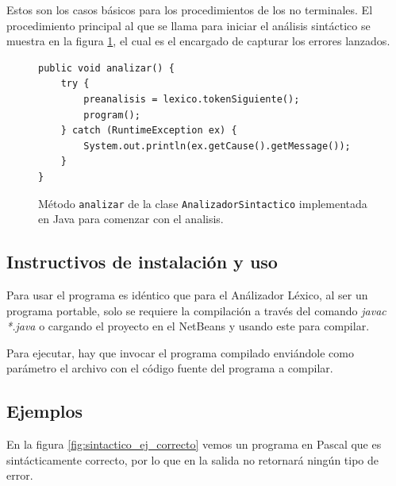 Estos son los casos básicos para los procedimientos de los no terminales. El procedimiento principal al que se llama para iniciar el análisis sintáctico se muestra en la figura \ref{fig:metodo_analizar}, el cual es el encargado de capturar los errores lanzados.

\begin{figure}[H]
\begin{verbatim}
public void analizar() {
	try {
		preanalisis = lexico.tokenSiguiente();
		program();
	} catch (RuntimeException ex) {
		System.out.println(ex.getCause().getMessage());
	}
}
\end{verbatim}
\caption{Método \texttt{analizar} de la clase \texttt{AnalizadorSintactico} implementada en Java para comenzar con el analisis.}
\label{fig:metodo_analizar}
\end{figure}


\subsection{Instructivos de instalación y uso}
Para usar el programa es idéntico que para el Análizador Léxico, al ser un programa portable, solo se requiere la compilación a través del comando \emph{javac *.java} o cargando el proyecto en el NetBeans y usando este para compilar.

Para ejecutar, hay que invocar el programa compilado enviándole como parámetro el archivo con el código fuente del programa a compilar.

\subsection{Ejemplos}
En la figura \ref{fig:sintactico_ej_correcto} vemos un programa en Pascal que es sintácticamente correcto, por lo que en la salida no retornará ningún tipo de error.

